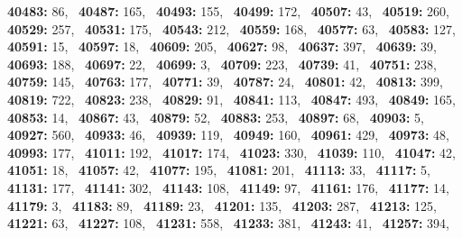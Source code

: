 \textbf{40483:} 86,\allowbreak~ 
\textbf{40487:} 165,\allowbreak~ 
\textbf{40493:} 155,\allowbreak~ 
\textbf{40499:} 172,\allowbreak~ 
\textbf{40507:} 43,\allowbreak~ 
\textbf{40519:} 260,\allowbreak~ 
\textbf{40529:} 257,\allowbreak~ 
\textbf{40531:} 175,\allowbreak~ 
\textbf{40543:} 212,\allowbreak~ 
\textbf{40559:} 168,\allowbreak~ 
\textbf{40577:} 63,\allowbreak~ 
\textbf{40583:} 127,\allowbreak~ 
\textbf{40591:} 15,\allowbreak~ 
\textbf{40597:} 18,\allowbreak~ 
\textbf{40609:} 205,\allowbreak~ 
\textbf{40627:} 98,\allowbreak~ 
\textbf{40637:} 397,\allowbreak~ 
\textbf{40639:} 39,\allowbreak~ 
\textbf{40693:} 188,\allowbreak~ 
\textbf{40697:} 22,\allowbreak~ 
\textbf{40699:} 3,\allowbreak~ 
\textbf{40709:} 223,\allowbreak~ 
\textbf{40739:} 41,\allowbreak~ 
\textbf{40751:} 238,\allowbreak~ 
\textbf{40759:} 145,\allowbreak~ 
\textbf{40763:} 177,\allowbreak~ 
\textbf{40771:} 39,\allowbreak~ 
\textbf{40787:} 24,\allowbreak~ 
\textbf{40801:} 42,\allowbreak~ 
\textbf{40813:} 399,\allowbreak~ 
\textbf{40819:} 722,\allowbreak~ 
\textbf{40823:} 238,\allowbreak~ 
\textbf{40829:} 91,\allowbreak~ 
\textbf{40841:} 113,\allowbreak~ 
\textbf{40847:} 493,\allowbreak~ 
\textbf{40849:} 165,\allowbreak~ 
\textbf{40853:} 14,\allowbreak~ 
\textbf{40867:} 43,\allowbreak~ 
\textbf{40879:} 52,\allowbreak~ 
\textbf{40883:} 253,\allowbreak~ 
\textbf{40897:} 68,\allowbreak~ 
\textbf{40903:} 5,\allowbreak~ 
\textbf{40927:} 560,\allowbreak~ 
\textbf{40933:} 46,\allowbreak~ 
\textbf{40939:} 119,\allowbreak~ 
\textbf{40949:} 160,\allowbreak~ 
\textbf{40961:} 429,\allowbreak~ 
\textbf{40973:} 48,\allowbreak~ 
\textbf{40993:} 177,\allowbreak~ 
\textbf{41011:} 192,\allowbreak~ 
\textbf{41017:} 174,\allowbreak~ 
\textbf{41023:} 330,\allowbreak~ 
\textbf{41039:} 110,\allowbreak~ 
\textbf{41047:} 42,\allowbreak~ 
\textbf{41051:} 18,\allowbreak~ 
\textbf{41057:} 42,\allowbreak~ 
\textbf{41077:} 195,\allowbreak~ 
\textbf{41081:} 201,\allowbreak~ 
\textbf{41113:} 33,\allowbreak~ 
\textbf{41117:} 5,\allowbreak~ 
\textbf{41131:} 177,\allowbreak~ 
\textbf{41141:} 302,\allowbreak~ 
\textbf{41143:} 108,\allowbreak~ 
\textbf{41149:} 97,\allowbreak~ 
\textbf{41161:} 176,\allowbreak~ 
\textbf{41177:} 14,\allowbreak~ 
\textbf{41179:} 3,\allowbreak~ 
\textbf{41183:} 89,\allowbreak~ 
\textbf{41189:} 23,\allowbreak~ 
\textbf{41201:} 135,\allowbreak~ 
\textbf{41203:} 287,\allowbreak~ 
\textbf{41213:} 125,\allowbreak~ 
\textbf{41221:} 63,\allowbreak~ 
\textbf{41227:} 108,\allowbreak~ 
\textbf{41231:} 558,\allowbreak~ 
\textbf{41233:} 381,\allowbreak~ 
\textbf{41243:} 41,\allowbreak~ 
\textbf{41257:} 394,\allowbreak~ 
